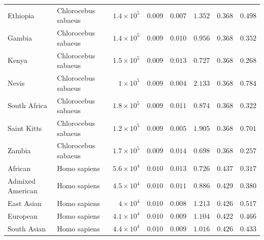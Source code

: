 \documentclass{article}
\begin{document}
\begin{center}
\begin{longtable*}{|l|l|r|r|r|r|r|r|}
             Ethiopia & Chlorocebus sabaeus & $1.4\times 10^{5}$ & $ 0.009$ & $ 0.007$ & $ 1.352$ & $ 0.368$ & $ 0.498$ \\
             Gambia & Chlorocebus sabaeus & $1.4\times 10^{5}$ & $ 0.009$ & $ 0.010$ & $ 0.956$ & $ 0.368$ & $ 0.352$ \\
             Kenya & Chlorocebus sabaeus & $1.5\times 10^{5}$ & $ 0.009$ & $ 0.013$ & $ 0.727$ & $ 0.368$ & $ 0.268$ \\
             Nevis & Chlorocebus sabaeus & $ 1\times 10^{5}$ & $ 0.009$ & $ 0.004$ & $ 2.133$ & $ 0.368$ & $ 0.784$ \\
             South Africa & Chlorocebus sabaeus & $1.8\times 10^{5}$ & $ 0.009$ & $ 0.011$ & $ 0.874$ & $ 0.368$ & $ 0.322$ \\
             Saint Kitts & Chlorocebus sabaeus & $1.2\times 10^{5}$ & $ 0.009$ & $ 0.005$ & $ 1.905$ & $ 0.368$ & $ 0.701$ \\
             Zambia & Chlorocebus sabaeus & $1.7\times 10^{5}$ & $ 0.009$ & $ 0.014$ & $ 0.698$ & $ 0.368$ & $ 0.257$ \\
            African & Homo sapiens & $5.6\times 10^{4}$ & $ 0.010$ & $ 0.013$ & $ 0.726$ & $ 0.437$ & $ 0.317$ \\
            Admixed American & Homo sapiens & $4.5\times 10^{4}$ & $ 0.010$ & $ 0.011$ & $ 0.886$ & $ 0.429$ & $ 0.380$ \\
            East Asian & Homo sapiens & $ 4\times 10^{4}$ & $ 0.010$ & $ 0.008$ & $ 1.213$ & $ 0.426$ & $ 0.517$ \\
            European & Homo sapiens & $4.1\times 10^{4}$ & $ 0.010$ & $ 0.009$ & $ 1.104$ & $ 0.422$ & $ 0.466$ \\
            South Asian & Homo sapiens & $4.4\times 10^{4}$ & $ 0.010$ & $ 0.009$ & $ 1.016$ & $ 0.426$ & $ 0.433$ \\
        \end{longtable*}
    \end{center}
\end{document}
